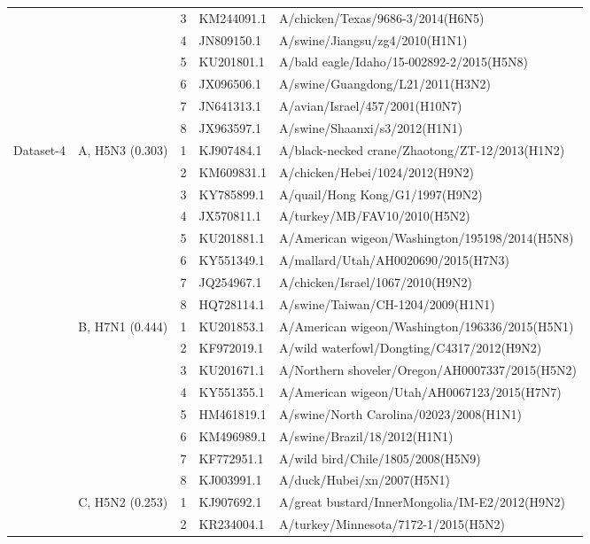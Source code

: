\begin{table}[t]
\begin{tabular}{cclll}
 &  & 3 & KM244091.1 & A/chicken/Texas/9686-3/2014(H6N5) \\
 &  & 4 & JN809150.1 & A/swine/Jiangsu/zg4/2010(H1N1) \\
 &  & 5 & KU201801.1 & A/bald eagle/Idaho/15-002892-2/2015(H5N8) \\
 &  & 6 & JX096506.1 & A/swine/Guangdong/L21/2011(H3N2) \\
 &  & 7 & JN641313.1 & A/avian/Israel/457/2001(H10N7) \\
 &  & 8 & JX963597.1 & A/swine/Shaanxi/s3/2012(H1N1) \\
\midrule
\multirow{24}{*}{Dataset-4} & \multirow{8}{*}{A, H5N3 (0.303)} & 1 & KJ907484.1 & A/black-necked crane/Zhaotong/ZT-12/2013(H1N2) \\
 &  & 2 & KM609831.1 & A/chicken/Hebei/1024/2012(H9N2) \\
 &  & 3 & KY785899.1 & A/quail/Hong Kong/G1/1997(H9N2) \\
 &  & 4 & JX570811.1 & A/turkey/MB/FAV10/2010(H5N2) \\
 &  & 5 & KU201881.1 & A/American wigeon/Washington/195198/2014(H5N8) \\
 &  & 6 & KY551349.1 & A/mallard/Utah/AH0020690/2015(H7N3) \\
 &  & 7 & JQ254967.1 & A/chicken/Israel/1067/2010(H9N2) \\
 &  & 8 & HQ728114.1 & A/swine/Taiwan/CH-1204/2009(H1N1) \\
\cmidrule(l){2-5}
 & \multirow{8}{*}{B, H7N1 (0.444)} & 1 & KU201853.1 & A/American wigeon/Washington/196336/2015(H5N1) \\
 &  & 2 & KF972019.1 & A/wild waterfowl/Dongting/C4317/2012(H9N2) \\
 &  & 3 & KU201671.1 & A/Northern shoveler/Oregon/AH0007337/2015(H5N2) \\
 &  & 4 & KY551355.1 & A/American wigeon/Utah/AH0067123/2015(H7N7) \\
 &  & 5 & HM461819.1 & A/swine/North Carolina/02023/2008(H1N1) \\
 &  & 6 & KM496989.1 & A/swine/Brazil/18/2012(H1N1) \\
 &  & 7 & KF772951.1 & A/wild bird/Chile/1805/2008(H5N9) \\
 &  & 8 & KJ003991.1 & A/duck/Hubei/xn/2007(H5N1) \\
\cmidrule(l){2-5}
 & \multirow{8}{*}{C, H5N2 (0.253)} & 1 & KJ907692.1 & A/great bustard/InnerMongolia/IM-E2/2012(H9N2) \\
 &  & 2 & KR234004.1 & A/turkey/Minnesota/7172-1/2015(H5N2) \\

\end{tabular}
\end{table}
